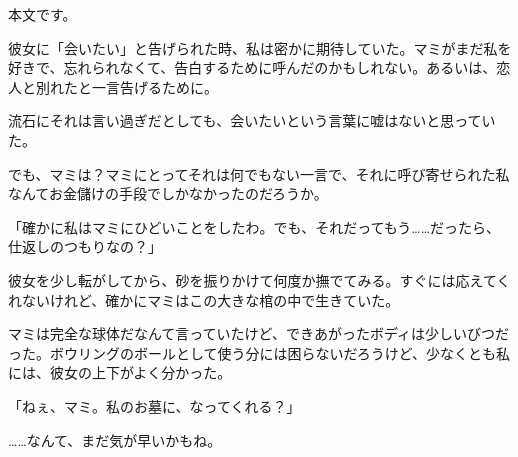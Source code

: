 
本文です。

\sectionbreak

彼女に「会いたい」と告げられた時、私は密かに期待していた。マミがまだ私を好きで、忘れられなくて、告白するために呼んだのかもしれない。あるいは、恋人と別れたと一言告げるために。

流石にそれは言い過ぎだとしても、会いたいという言葉に嘘はないと思っていた。

でも、マミは？マミにとってそれは何でもない一言で、それに呼び寄せられた私なんてお金儲けの手段でしかなかったのだろうか。

「確かに私はマミにひどいことをしたわ。でも、それだってもう……だったら、仕返しのつもりなの？」

\sectionbreak

彼女を少し転がしてから、砂を振りかけて何度か撫でてみる。すぐには応えてくれないけれど、確かにマミはこの大きな棺の中で生きていた。

マミは完全な球体だなんて言っていたけど、できあがったボディは少しいびつだった。ボウリングのボールとして使う分には困らないだろうけど、少なくとも私には、彼女の上下がよく分かった。

「ねぇ、マミ。私のお墓に、なってくれる？」

……なんて、まだ気が早いかもね。
